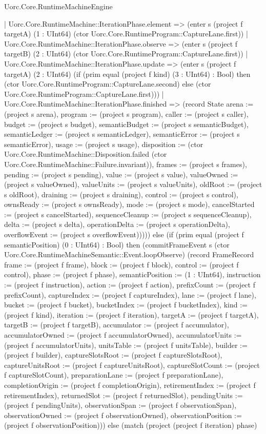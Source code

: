 \begin{lexlean}{Uorc.Core.RuntimeMachineEngine}
\begin{semanticmodule}
{      | Uorc.Core.RuntimeMachine::IterationPhase.element => (enter s (project f targetA) (1 : UInt64) (ctor Uorc.Core.RuntimeProgram::CaptureLane.first))
      | Uorc.Core.RuntimeMachine::IterationPhase.observe => (enter s (project f targetB) (2 : UInt64) (ctor Uorc.Core.RuntimeProgram::CaptureLane.first))
      | Uorc.Core.RuntimeMachine::IterationPhase.update => (enter s (project f targetA) (2 : UInt64) (if (prim equal (project f kind) (3 : UInt64) : Bool) then (ctor Uorc.Core.RuntimeProgram::CaptureLane.second) else (ctor Uorc.Core.RuntimeProgram::CaptureLane.first)))
      | Uorc.Core.RuntimeMachine::IterationPhase.finished => (record State {arena := (project s arena), program := (project s program), caller := (project s caller), budget := (project s budget), semanticBudget := (project s semanticBudget), semanticLedger := (project s semanticLedger), semanticError := (project s semanticError), usage := (project s usage), disposition := (ctor Uorc.Core.RuntimeMachine::Disposition.failed (ctor Uorc.Core.RuntimeMachine::Failure.invariant)), frames := (project s frames), pending := (project s pending), value := (project s value), valueOwned := (project s valueOwned), valueUnits := (project s valueUnits), oldRoot := (project s oldRoot), draining := (project s draining), control := (project s control), ownsReady := (project s ownsReady), mode := (project s mode), cancelStarted := (project s cancelStarted), sequenceCleanup := (project s sequenceCleanup), delta := (project s delta), operationDelta := (project s operationDelta), overflowEvent := (project s overflowEvent)})))) else (if (prim equal (project f semanticPosition) (0 : UInt64) : Bool) then (commitFrameEvent s (ctor Uorc.Core.RuntimeMachineSemantic::Event.loopObserve) (record FrameRecord {frame := (project f frame), block := (project f block), control := (project f control), phase := (project f phase), semanticPosition := (1 : UInt64), instruction := (project f instruction), action := (project f action), prefixCount := (project f prefixCount), captureIndex := (project f captureIndex), lane := (project f lane), bucket := (project f bucket), bucketIndex := (project f bucketIndex), kind := (project f kind), iteration := (project f iteration), targetA := (project f targetA), targetB := (project f targetB), accumulator := (project f accumulator), accumulatorOwned := (project f accumulatorOwned), accumulatorUnits := (project f accumulatorUnits), unitsTable := (project f unitsTable), builder := (project f builder), captureSlotsRoot := (project f captureSlotsRoot), captureUnitsRoot := (project f captureUnitsRoot), captureSlotCount := (project f captureSlotCount), preparationLane := (project f preparationLane), completionOrigin := (project f completionOrigin), retirementIndex := (project f retirementIndex), returnedSlot := (project f returnedSlot), pendingUnits := (project f pendingUnits), observationSpan := (project f observationSpan), observationOwned := (project f observationOwned), observationPosition := (project f observationPosition)})) else (match (project (project f iteration) phase)
}
\end{semanticmodule}
\end{lexlean}
